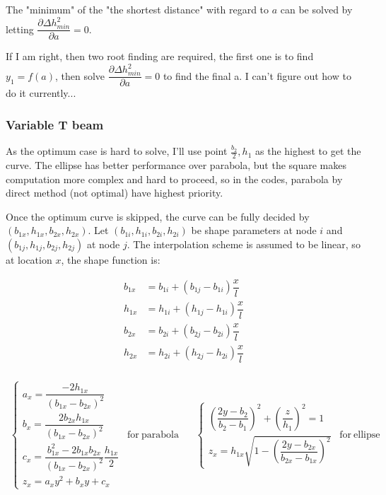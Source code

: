 The "minimum" of the "the shortest distance" with regard to $ a $ can be solved by letting $ \dfrac{\partial \Delta h_{min}^2}{ \partial a} = 0 $.

If I am right, then two root finding are required, the first one is to find $ y_1 = f(a) $, then solve $ \dfrac{\partial \Delta h_{min}^2}{ \partial a} = 0 $ to find the final a. I can't figure out how to do it currently... 

\subsubsection{Variable T beam}
As the optimum case is hard to solve, I'll use point $ \frac{b_2}{2}, h_1 $ as the highest to get the curve. The ellipse has better performance over parabola, but the square makes computation more complex and hard to proceed, so in the codes, parabola by direct method (not optimal) have highest priority.

Once the optimum curve is skipped, the curve can be fully decided by $ (b_{1x}, h_{1x}, b_{2x}, h_{2x}) $. Let $ (b_{1i}, h_{1i}, b_{2i}, h_{2i}) $ be shape parameters at node $ i $ and $ (b_{1j}, h_{1j}, b_{2j}, h_{2j}) $ at node $ j $. The interpolation scheme is assumed to be linear, so at location $ x $, the shape function is:

\begin{align*}
b_{1x} &= b_{1i} + \left( b_{1j}-b_{1i}\right)  \dfrac{x}{l} \\
h_{1x} &= h_{1i} + \left( h_{1j}-h_{1i}\right)  \dfrac{x}{l} \\
b_{2x} &= b_{2i} + \left( b_{2j}-b_{2i}\right)  \dfrac{x}{l} \\
h_{2x} &= h_{2i} + \left( h_{2j}-h_{2i}\right)  \dfrac{x}{l} \\
\end{align*}

\begin{align*}
\begin{cases}
a_x = \dfrac{-2 h_{1x} }{(b_{1x}-b_{2x})^2} \\
b_x = \dfrac{2 b_{2x} h_{1x} }{(b_{1x}-b_{2x})^2} \\
c_x = \dfrac{b_{1x}^2 - 2 b_{1x} b_{2x}}{(b_{1x}-b_{2x})^2} \dfrac{h_{1x}}{2}\\
z_x = a_x y^2 + b_x y + c_x
\end{cases}~~\mathrm{for~parabola} ~~~~ & \begin{cases*}
\left( \dfrac{2y-b_2}{b_2-b_1} \right) ^2 + \left( \dfrac{z}{h_1} \right) ^2 = 1 \\
z_x = h_{1x} \sqrt{1- \left( \dfrac{2y-b_{2x}}{b_{2x}-b_{1x}} \right) ^2}
\end{cases*}~~\mathrm{for~ellipse}
\end{align*}

